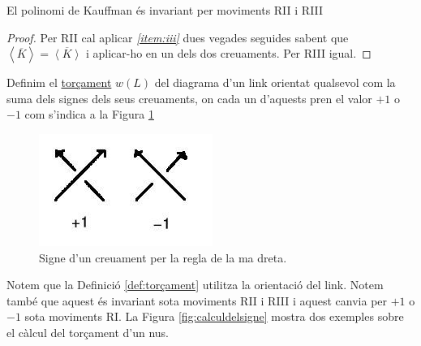 \begin{lemma}\label{lem:RIIiRIII}
	El polinomi de Kauffman és invariant per moviments RII i RIII
\end{lemma}

\begin{proof}
	Per RII cal aplicar \textit{\ref{item:iii}} dues vegades seguides sabent que $\left\langle\overline{K}\right\rangle=\overline{\left\langle K\right\rangle}$ i aplicar-ho en un dels dos creuaments. Per RIII igual.
\end{proof}

\begin{definition}\label{def:torçament}
	Definim el \underline{torçament} $w(L)$ del diagrama d'un link orientat qualsevol com la suma dels signes dels seus creuaments, on cada un d'aquests pren el valor $+1$ o $-1$ com s'indica a la Figura \ref{fig:signe}
\end{definition}

\begin{figure}
	\centering
	\includegraphics[width=0.9\linewidth]{img/signe.jpg}
	\caption{Signe d'un creuament per la regla de la ma dreta.}\label{fig:signe}
\end{figure}

Notem que la Definició \ref{def:torçament} utilitza la orientació del link. Notem també que aquest és invariant sota moviments RII i RIII i aquest canvia per $+1$ o $-1$ sota moviments RI. La Figura \ref{fig:calculdelsigne} mostra dos exemples sobre el càlcul del torçament d'un nus.\\

